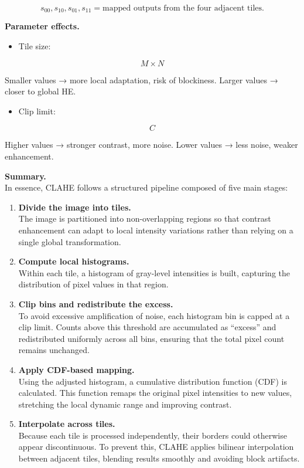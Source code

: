 \documentclass[11pt]{article}
\providecommand{\tightlist}{%
      \setlength{\itemsep}{0pt}\setlength{\parskip}{0pt}}
\begin{document}
\[
s_{00}, s_{10}, s_{01}, s_{11} = \text{mapped outputs from the four adjacent tiles.}
\]

\textbf{Parameter effects.}

\begin{itemize}
\tightlist
\item
  Tile size:
\end{itemize}

\[
M \times N
\]

Smaller values → more local adaptation, risk of blockiness. Larger
values → closer to global HE.

\begin{itemize}
\tightlist
\item
  Clip limit:
\end{itemize}

\[
C
\]

Higher values → stronger contrast, more noise. Lower values → less
noise, weaker enhancement.

\textbf{Summary.}\\
In essence, CLAHE follows a structured pipeline composed of five main
stages:

\begin{enumerate}
\def\labelenumi{\arabic{enumi}.}
\item
  \textbf{Divide the image into tiles.}\\
  The image is partitioned into non-overlapping regions so that contrast
  enhancement can adapt to local intensity variations rather than
  relying on a single global transformation.
\item
  \textbf{Compute local histograms.}\\
  Within each tile, a histogram of gray-level intensities is built,
  capturing the distribution of pixel values in that region.
\item
  \textbf{Clip bins and redistribute the excess.}\\
  To avoid excessive amplification of noise, each histogram bin is
  capped at a clip limit. Counts above this threshold are accumulated as
  ``excess'' and redistributed uniformly across all bins, ensuring that
  the total pixel count remains unchanged.
\item
  \textbf{Apply CDF-based mapping.}\\
  Using the adjusted histogram, a cumulative distribution function (CDF)
  is calculated. This function remaps the original pixel intensities to
  new values, stretching the local dynamic range and improving contrast.
\item
  \textbf{Interpolate across tiles.}\\
  Because each tile is processed independently, their borders could
  otherwise appear discontinuous. To prevent this, CLAHE applies
  bilinear interpolation between adjacent tiles, blending results
  smoothly and avoiding block artifacts.
\end{enumerate}
\end{document}
